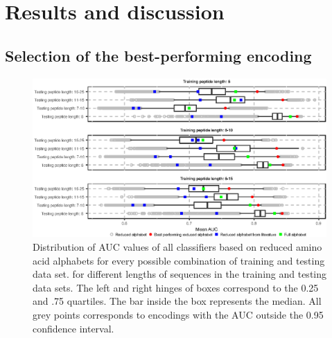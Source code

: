 \documentclass{bioinfo}
\begin{document}
\section{Results and discussion}

\subsection{Selection of the best-performing encoding}

\begin{figure}[!tpb]
\centerline{\includegraphics{figures/AUC_boxplot.eps}}
\caption{Distribution of AUC values of all classifiers based on reduced amino acid 
alphabets for every possible combination of training and testing data set. 
%
%
%
%
%
%
%
for different lengths of sequences in the training and testing data sets. 
The left and right hinges of boxes correspond to the 0.25 and .75 quartiles. 
The bar inside the box represents the median. All grey points corresponds to
encodings with the AUC outside the 0.95 confidence interval. 
}\label{fig:AUC_boxplot} 
\end{figure}
\end{document}
